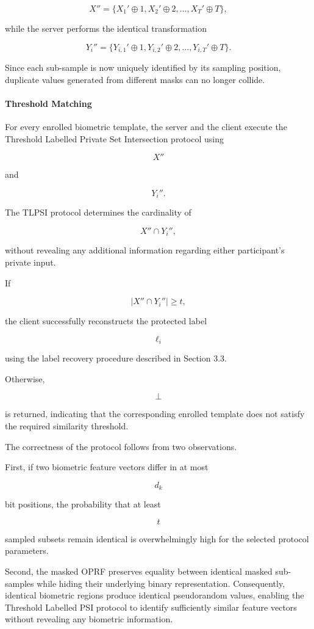 \documentclass[11pt,a4paper]{article}
\begin{document}
\[
X''
=
\{
X_1'
\oplus1,
X_2'
\oplus2,
\ldots,
X_T'
\oplus T
\},
\]

while the server performs the identical transformation

\[
Y_i''
=
\{
Y_{i,1}'
\oplus1,
Y_{i,2}'
\oplus2,
\ldots,
Y_{i,T}'
\oplus T
\}.
\]

Since each sub-sample is now uniquely identified by its sampling position, duplicate values generated from different masks can no longer collide.

\paragraph{Threshold Matching}

For every enrolled biometric template, the server and the client execute the Threshold Labelled Private Set Intersection protocol using

\[
X''
\]

and

\[
Y_i''.
\]

The TLPSI protocol determines the cardinality of

\[
X''
\cap
Y_i'',
\]

without revealing any additional information regarding either participant's private input.

If

\[
|X''\cap Y_i''|
\ge
t,
\]

the client successfully reconstructs the protected label

\[
\ell_i
\]

using the label recovery procedure described in Section 3.3.

Otherwise,

\[
\perp
\]

is returned, indicating that the corresponding enrolled template does not satisfy the required similarity threshold.

The correctness of the protocol follows from two observations.

First, if two biometric feature vectors differ in at most

\[
d_k
\]

bit positions, the probability that at least

\[
t
\]

sampled subsets remain identical is overwhelmingly high for the selected protocol parameters.

Second, the masked OPRF preserves equality between identical masked sub-samples while hiding their underlying binary representation. Consequently, identical biometric regions produce identical pseudorandom values, enabling the Threshold Labelled PSI protocol to identify sufficiently similar feature vectors without revealing any biometric information.
\end{document}

